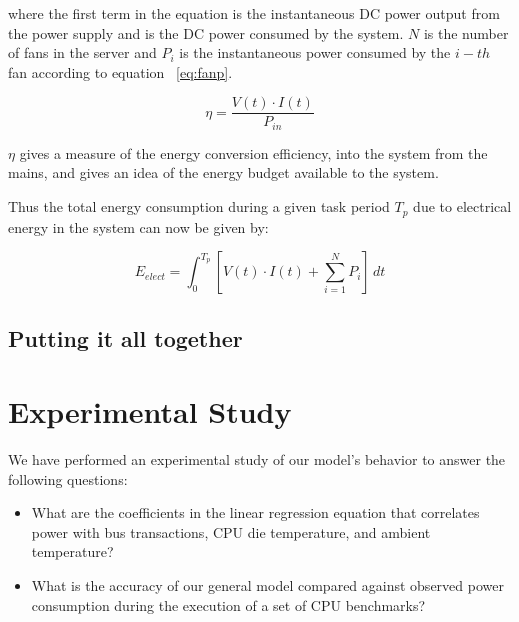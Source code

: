 \documentclass[times, 10pt,onecolumn]{article}
\begin{document}
where the first term in the equation is the instantaneous DC power
output from the power supply and is the DC power consumed by the
system. $N$ is the number of fans in the server and $P_{i}$ is the
instantaneous power consumed by the $i-th$ fan according to equation
~\ref{eq:fanp}. 

\begin{equation}
\label{eq:elect}
\eta=  \frac{V(t) \cdot I(t)}{P_{in}}
\end{equation} 

$\eta$ gives a measure of the energy conversion efficiency, into the
system from the mains, and gives an idea of the energy budget available
to the system.

Thus the total energy consumption during a given task period $T_{p}$ due
to electrical energy in the system can now be given by:

\begin{equation}
\label{eq:elect}
E_{elect} =  \int^{T_{p}}_0 [V(t) \cdot I(t) + \sum_{i=1}^NP_{i}]\,dt
\end{equation} 

\subsection{Putting it all together}
\label{sec:wholemodel}


\section{Experimental Study}
\label{sec:experiment}
We have performed an experimental study of our model's behavior to answer the
following questions:
\begin{itemize}
\item 
  What are the coefficients in the linear regression equation that
  correlates power with bus transactions, CPU die temperature, and
  ambient temperature?
\item What is the accuracy of our general model compared against
  observed power consumption during the execution of a set of CPU benchmarks?
\end{itemize}
\end{document}
